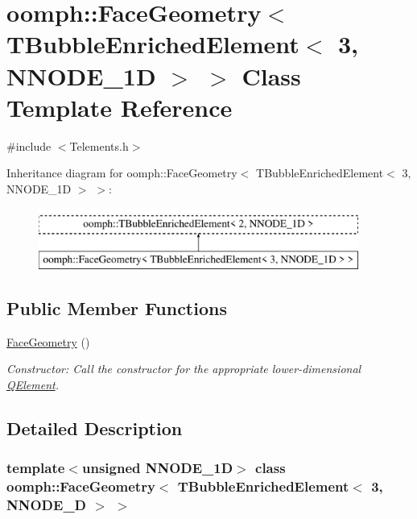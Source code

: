 \hypertarget{classoomph_1_1FaceGeometry_3_01TBubbleEnrichedElement_3_013_00_01NNODE__1D_01_4_01_4}{}\section{oomph\+:\+:Face\+Geometry$<$ T\+Bubble\+Enriched\+Element$<$ 3, N\+N\+O\+D\+E\+\_\+1D $>$ $>$ Class Template Reference}
\label{classoomph_1_1FaceGeometry_3_01TBubbleEnrichedElement_3_013_00_01NNODE__1D_01_4_01_4}


{\ttfamily \#include $<$Telements.\+h$>$}

Inheritance diagram for oomph\+:\+:Face\+Geometry$<$ T\+Bubble\+Enriched\+Element$<$ 3, N\+N\+O\+D\+E\+\_\+1D $>$ $>$\+:\begin{figure}[H]
\begin{center}
\leavevmode
\includegraphics[height=2.000000cm]{classoomph_1_1FaceGeometry_3_01TBubbleEnrichedElement_3_013_00_01NNODE__1D_01_4_01_4}
\end{center}
\end{figure}
\subsection*{Public Member Functions}
\begin{DoxyCompactItemize}
\item 
\hyperlink{classoomph_1_1FaceGeometry_3_01TBubbleEnrichedElement_3_013_00_01NNODE__1D_01_4_01_4_a53264b6a17821644b1c1a910678152ff}{Face\+Geometry} ()
\begin{DoxyCompactList}\small\item\em Constructor\+: Call the constructor for the appropriate lower-\/dimensional \hyperlink{classoomph_1_1QElement}{Q\+Element}. \end{DoxyCompactList}\end{DoxyCompactItemize}


\subsection{Detailed Description}
\subsubsection*{template$<$unsigned N\+N\+O\+D\+E\+\_\+1D$>$\newline
class oomph\+::\+Face\+Geometry$<$ T\+Bubble\+Enriched\+Element$<$ 3, N\+N\+O\+D\+E\+\_\+D $>$ $>$}

